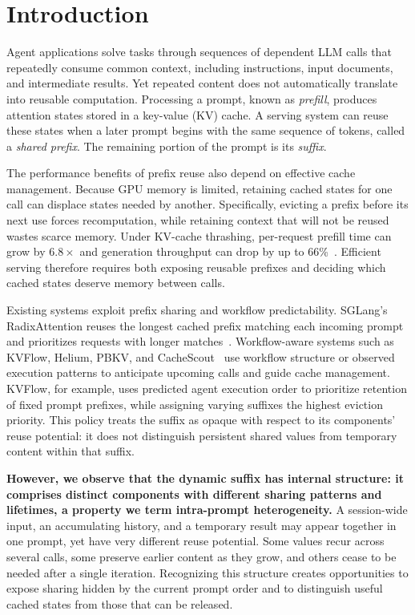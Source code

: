 \section{Introduction}
\label{sec:intro}

Agent applications solve tasks through sequences of dependent LLM calls that repeatedly consume common context, including instructions, input documents, and intermediate results. Yet repeated content does not automatically translate into reusable computation. Processing a prompt, known as \emph{prefill}, produces attention states stored in a key-value (KV) cache. A serving system can reuse these states when a later prompt begins with the same sequence of tokens, called a \emph{shared prefix}. The remaining portion of the prompt is its \emph{suffix}.

The performance benefits of prefix reuse also depend on effective cache management. Because GPU memory is limited, retaining cached states for one call can displace states needed by another. Specifically, evicting a prefix before its next use forces recomputation, while retaining context that will not be reused wastes scarce memory. Under KV-cache thrashing, per-request prefill time can grow by $6.8\times$ and generation throughput can drop by up to 66\%~\cite{yuan2026agentic}. Efficient serving therefore requires both exposing reusable prefixes and deciding which cached states deserve memory between calls.

Existing systems exploit prefix sharing and workflow predictability. SGLang's RadixAttention reuses the longest cached prefix matching each incoming prompt and prioritizes requests with longer matches~\cite{zheng2024sglang}. Workflow-aware systems such as KVFlow, Helium, PBKV, and CacheScout~\cite{pan2025kvflow,wadlom2026helium,zheng2026pbkv,zhang2026cachescout} use workflow structure or observed execution patterns to anticipate upcoming calls and guide cache management. KVFlow, for example, uses predicted agent execution order to prioritize retention of fixed prompt prefixes, while assigning varying suffixes the highest eviction priority. This policy treats the suffix as opaque with respect to its components' reuse potential: it does not distinguish persistent shared values from temporary content within that suffix.

\textbf{However, we observe that the dynamic suffix has internal structure: it comprises distinct components with different sharing patterns and lifetimes, a property we term intra-prompt heterogeneity.} A session-wide input, an accumulating history, and a temporary result may appear together in one prompt, yet have very different reuse potential. Some values recur across several calls, some preserve earlier content as they grow, and others cease to be needed after a single iteration. Recognizing this structure creates opportunities to expose sharing hidden by the current prompt order and to distinguish useful cached states from those that can be released.

